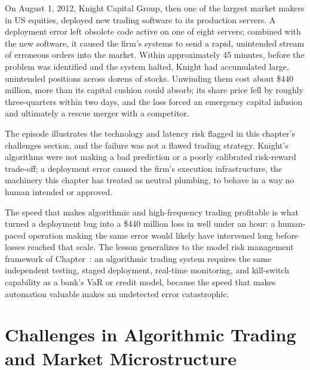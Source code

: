 \documentclass[../ai_in_finance]{subfiles}
\begin{document}

On August 1, 2012, Knight Capital Group, then one of the largest market makers in US equities, deployed new trading software to its production servers. A deployment error left obsolete code active on one of eight servers; combined with the new software, it caused the firm's systems to send a rapid, unintended stream of erroneous orders into the market. Within approximately 45 minutes, before the problem was identified and the system halted, Knight had accumulated large, unintended positions across dozens of stocks. Unwinding them cost about \$440 million, more than its capital cushion could absorb; its share price fell by roughly three-quarters within two days, and the loss forced an emergency capital infusion and ultimately a rescue merger with a competitor.

The episode illustrates the technology and latency risk flagged in this chapter's challenges section, and the failure was not a flawed trading strategy. Knight's algorithms were not making a bad prediction or a poorly calibrated risk-reward trade-off; a deployment error caused the firm's execution infrastructure, the machinery this chapter has treated as neutral plumbing, to behave in a way no human intended or approved.

The speed that makes algorithmic and high-frequency trading profitable is what turned a deployment bug into a \$440 million loss in well under an hour: a human-paced operation making the same error would likely have intervened long before losses reached that scale. The lesson generalizes to the model risk management framework of Chapter~: an algorithmic trading system requires the same independent testing, staged deployment, real-time monitoring, and kill-switch capability as a bank's VaR or credit model, because the speed that makes automation valuable makes an undetected error catastrophic.

\section{Challenges in Algorithmic Trading and Market Microstructure}
\end{document}
